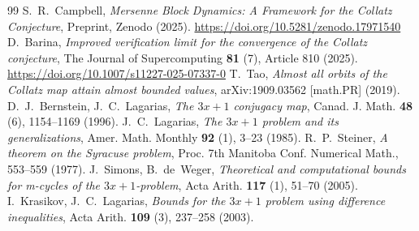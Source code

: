 \documentclass[11pt,reqno]{amsart}
\theoremstyle{definition}
\theoremstyle{remark}
\numberwithin{equation}{section}
\begin{document}
\begin{center}
\end{center}

\begin{thebibliography}{99}
 S.~R.~Campbell, \emph{Mersenne Block Dynamics: A Framework for the Collatz Conjecture}, Preprint, Zenodo (2025). \url{https://doi.org/10.5281/zenodo.17971540}
 D.~Barina, \emph{Improved verification limit for the convergence of the Collatz conjecture}, The Journal of Supercomputing \textbf{81} (7), Article 810 (2025). \url{https://doi.org/10.1007/s11227-025-07337-0}
 T.~Tao, \emph{Almost all orbits of the Collatz map attain almost bounded values}, arXiv:1909.03562 [math.PR] (2019).
 D.~J.~Bernstein, J.~C.~Lagarias, \emph{The $3x+1$ conjugacy map}, Canad. J. Math. \textbf{48} (6), 1154--1169 (1996).
 J.~C.~Lagarias, \emph{The $3x+1$ problem and its generalizations}, Amer. Math. Monthly \textbf{92} (1), 3--23 (1985).
 R.~P.~Steiner, \emph{A theorem on the Syracuse problem}, Proc. 7th Manitoba Conf. Numerical Math., 553--559 (1977).
 J.~Simons, B.~de~Weger, \emph{Theoretical and computational bounds for m-cycles of the $3x+1$-problem}, Acta Arith. \textbf{117} (1), 51--70 (2005).
 I.~Krasikov, J.~C.~Lagarias, \emph{Bounds for the $3x+1$ problem using difference inequalities}, Acta Arith. \textbf{109} (3), 237--258 (2003).
\end{thebibliography}
\end{document}
